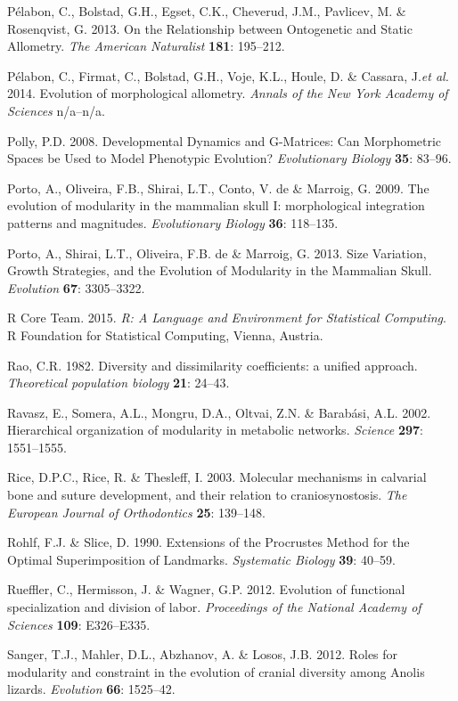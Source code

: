 \documentclass[12pt,twoside]{report}
\begin{document}
Pélabon, C., Bolstad, G.H., Egset, C.K., Cheverud, J.M., Pavlicev, M. \&
Rosenqvist, G. 2013. On the Relationship between Ontogenetic and Static
Allometry. \emph{The American Naturalist} \textbf{181}: 195--212.

Pélabon, C., Firmat, C., Bolstad, G.H., Voje, K.L., Houle, D. \&
Cassara, J.\emph{et al.} 2014. Evolution of morphological allometry.
\emph{Annals of the New York Academy of Sciences} n/a--n/a.

Polly, P.D. 2008. Developmental Dynamics and G-Matrices: Can
Morphometric Spaces be Used to Model Phenotypic Evolution?
\emph{Evolutionary Biology} \textbf{35}: 83--96.

Porto, A., Oliveira, F.B., Shirai, L.T., Conto, V. de \& Marroig, G.
2009. The evolution of modularity in the mammalian skull I:
morphological integration patterns and magnitudes. \emph{Evolutionary
Biology} \textbf{36}: 118--135.

Porto, A., Shirai, L.T., Oliveira, F.B. de \& Marroig, G. 2013. Size
Variation, Growth Strategies, and the Evolution of Modularity in the
Mammalian Skull. \emph{Evolution} \textbf{67}: 3305--3322.

R Core Team. 2015. \emph{R: A Language and Environment for Statistical
Computing}. R Foundation for Statistical Computing, Vienna, Austria.

Rao, C.R. 1982. Diversity and dissimilarity coefficients: a unified
approach. \emph{Theoretical population biology} \textbf{21}: 24--43.

Ravasz, E., Somera, A.L., Mongru, D.A., Oltvai, Z.N. \& Barabási, A.L.
2002. Hierarchical organization of modularity in metabolic networks.
\emph{Science} \textbf{297}: 1551--1555.

Rice, D.P.C., Rice, R. \& Thesleff, I. 2003. Molecular mechanisms in
calvarial bone and suture development, and their relation to
craniosynostosis. \emph{The European Journal of Orthodontics}
\textbf{25}: 139--148.

Rohlf, F.J. \& Slice, D. 1990. Extensions of the Procrustes Method for
the Optimal Superimposition of Landmarks. \emph{Systematic Biology}
\textbf{39}: 40--59.

Rueffler, C., Hermisson, J. \& Wagner, G.P. 2012. Evolution of
functional specialization and division of labor. \emph{Proceedings of
the National Academy of Sciences} \textbf{109}: E326--E335.

Sanger, T.J., Mahler, D.L., Abzhanov, A. \& Losos, J.B. 2012. Roles for
modularity and constraint in the evolution of cranial diversity among
Anolis lizards. \emph{Evolution} \textbf{66}: 1525--42.
\end{document}
